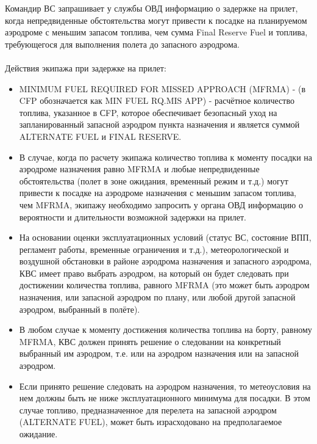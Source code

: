 Командир ВС запрашивает у службы ОВД информацию о задержке на прилет, когда непредвиденные обстоятельства могут привести к посадке на планируемом аэродроме с меньшим запасом топлива, чем сумма Final Reserve Fuel и топлива, требующегося для выполнения полета до запасного аэродрома.

 \paragraph{} Действия экипажа при задержке на прилет:

\begin{itemize}
    \item MINIMUM FUEL REQUIRED FOR MISSED APPROACH (MFRMA) - (в CFP обозначается как MIN FUEL RQ.MIS APP) - расчётное количество топлива, указанное в СFP, которое обеспечивает безопасный уход на запланированный запасной аэродром пункта назначения и является суммой ALTERNATE FUEL и FINAL RESERVE. 
    \item В случае, когда по расчету экипажа количество топлива к моменту посадки на аэродроме назначения равно MFRMA и любые непредвиденные обстоятельства (полет в зоне ожидания, временный режим и т.д.) могут привести к посадке на аэродроме назначения с меньшим запасом топлива, чем MFRMA, экипажу необходимо запросить у органа ОВД информацию о вероятности и длительности возможной задержки на прилет.
    \item На основании оценки эксплуатационных условий (статус ВС, состояние ВПП, регламент работы, временные ограничения и т.д.), метеорологической и воздушной обстановки в районе аэродрома назначения и запасного аэродрома, КВС имеет право выбрать аэродром, на который он будет следовать при достижении количества топлива, равного MFRMA (это может быть аэродром назначения, или запасной аэродром по плану, или любой другой запасной аэродром, выбранный в полёте).
    \item В любом случае к моменту достижения количества топлива на борту, равному MFRMA, КВС должен принять решение о следовании на конкретный выбранный им аэродром, т.е. или на аэродром назначения или на запасной аэродром.
    \item Если принято решение следовать на аэродром назначения, то метеоусловия на нем должны быть не ниже эксплуатационного минимума для посадки. В этом случае топливо, предназначенное для перелета на запасной аэродром (ALTERNATE FUEL), может быть израсходовано на предполагаемое ожидание.
\end{itemize}

